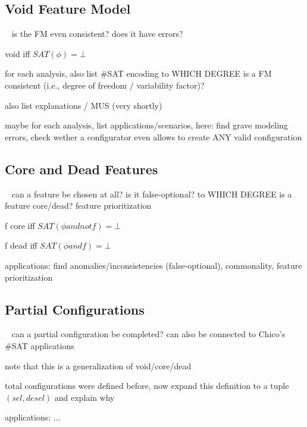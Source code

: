 \subsection{Void Feature Model}
\begin{frame}{~}
    is the FM even consistent? does it have errors? %

    void iff $SAT(\phi) = \bot$

    for each analysis, also list \#SAT encoding
    to WHICH DEGREE is a FM consistent (i.e., degree of freedom / variability factor)?

    also list explanations / MUS (very shortly)

    maybe for each analysis, list applications/scenarios, here: find grave modeling errors, check wether a configurator even allows to create ANY valid configuration
\end{frame}

\subsection{Core and Dead Features} %
\begin{frame}{~}
    can a feature be chosen at all? is it false-optional?
    to WHICH DEGREE is a feature core/dead? feature prioritization
   
    f core iff $SAT(\phi and not f) = \bot$
    
    f dead iff $SAT(\phi and f) = \bot$

    applications: find anomalies/inconsistencies (false-optional), commonality, feature prioritization
\end{frame}

\subsection{Partial Configurations}
\begin{frame}{~}
    can a partial configuration be completed?
    can also be connected to Chico's \#SAT applications

    note that this is a generalization of void/core/dead

    total configurations were defined before, now expand this definition to a tuple $(sel, desel)$ and explain why

    applications: ...
\end{frame}

